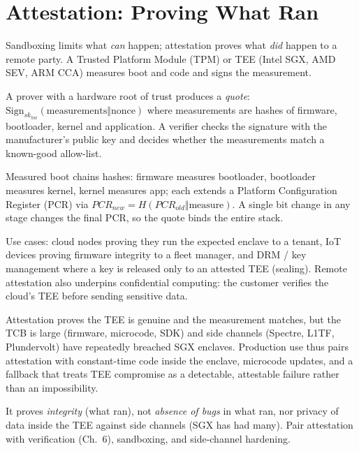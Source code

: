 \section{Attestation: Proving What Ran}
\label{sec:attestation}
Sandboxing limits what \emph{can} happen; attestation proves what \emph{did} happen to a remote party. A Trusted Platform Module (TPM) or TEE (Intel SGX, AMD SEV, ARM CCA) measures boot and code and signs the measurement.

{\sloppy
\begin{definition}
A prover with a hardware root of trust produces a \emph{quote}: $\text{Sign}_{sk_{hw}}(\text{measurements} \Vert \text{nonce})$ where measurements are hashes of firmware, bootloader, kernel and application. A verifier checks the signature with the manufacturer's public key and decides whether the measurements match a known-good allow-list.
\end{definition}
\par}

{\sloppy
Measured boot chains hashes: firmware measures bootloader, bootloader measures kernel, kernel measures app; each extends a Platform Configuration Register (PCR) via $PCR_{new}=H(PCR_{old}\Vert \text{measure})$. A single bit change in any stage changes the final PCR, so the quote binds the entire stack.
\par}

Use cases: cloud nodes proving they run the expected enclave to a tenant, IoT devices proving firmware integrity to a fleet manager, and DRM / key management where a key is released only to an attested TEE (sealing). Remote attestation also underpins confidential computing: the customer verifies the cloud's TEE before sending sensitive data.


\begin{remark}
Attestation proves the TEE is genuine and the measurement matches, but the TCB is large (firmware, microcode, SDK) and side channels (Spectre, L1TF, Plundervolt) have repeatedly breached SGX enclaves. Production use thus pairs attestation with constant-time code inside the enclave, microcode updates, and a fallback that treats TEE compromise as a detectable, attestable failure rather than an impossibility.

\end{remark}

\begin{remark}
It proves \emph{integrity} (what ran), not \emph{absence of bugs} in what ran, nor privacy of data inside the TEE against side channels (SGX has had many). Pair attestation with verification (Ch.~6), sandboxing, and side-channel hardening.
\end{remark}

